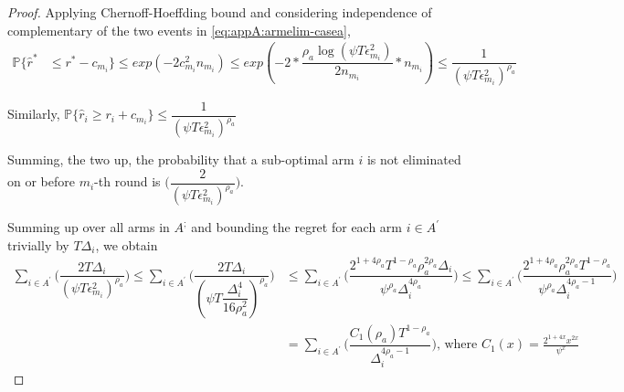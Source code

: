 \begin{proof}
 
% 
Applying Chernoff-Hoeffding bound and considering independence of complementary of the two events in \ref{eq:appA:armelim-casea},
  \begin{align*}
\mathbb{P}\lbrace\hat{r}^{*}&\leq r^{*} - c_{m_{i}}\rbrace\leq exp(-2c_{m_{i}}^{2}n_{m_{i}})
\leq exp(-2 * \dfrac{\rho_{a}\log (\psi T\epsilon_{m_{i}}^{2})}{2 n_{m_{i}}} *n_{m_{i}})
\leq \dfrac{1}{(\psi T\epsilon_{m_{i}}^{2})^{\rho_{a}}}   
  \end{align*}
 
 
Similarly, $\mathbb{P}\lbrace\hat{r}_{i}\geq r_{i} + c_{m_{i}}\rbrace\leq \dfrac{1}{(\psi  T\epsilon_{m_{i}}^{2})^{\rho_{a}}}$
 
Summing, the two up, the probability that a sub-optimal arm ${i}$ is not eliminated on or before $m_{i}$-th round is  $\bigg(\dfrac{2}{(\psi T\epsilon_{m_{i}}^{2})^{\rho_{a}}}\bigg)$. 
 
Summing up over all arms in $A^{;}$ and bounding the regret for each arm $i\in A^{'}$ trivially by $T\Delta_{i}$, we obtain
   \begin{align*}
\sum_{i\in A^{'}}\bigg(\dfrac{2T\Delta_{i}}{(\psi T\epsilon_{m_{i}}^{2})^{\rho_{a}}}\bigg)
\leq\sum_{i\in A^{'}}\bigg(\dfrac{2T\Delta_{i}}{(\psi T\dfrac{\Delta_{i}^{4}}{16\rho_{a}^{2}})^{\rho_{a}}}\bigg)
&\leq \sum_{i\in A^{'}}\bigg(\dfrac{2^{1+4\rho_{a}}T^{1-\rho_{a}}\rho_{a}^{2\rho_{a}}\Delta_{i}}{\psi^{\rho_{a}}\Delta_{i}^{4\rho_{a}}}\bigg)
\leq \sum_{i\in A^{'}}\bigg(\dfrac{2^{1+4\rho_{a}}\rho_{a}^{2\rho_{a}}T^{1-\rho_{a}}}{\psi^{\rho_{a}}\Delta_{i}^{4\rho_{a}-1}}\bigg)\\   
& =\sum_{i\in A^{'}}\bigg(\dfrac{C_{1}(\rho_{a})T^{1-\rho_{a}}}{\Delta_{i}^{4\rho_{a}-1}}\bigg) \text{, where } C_1(x) = \frac{2^{1+4x}x^{2x}}{\psi^{x}}
   \end{align*}


\end{proof}
